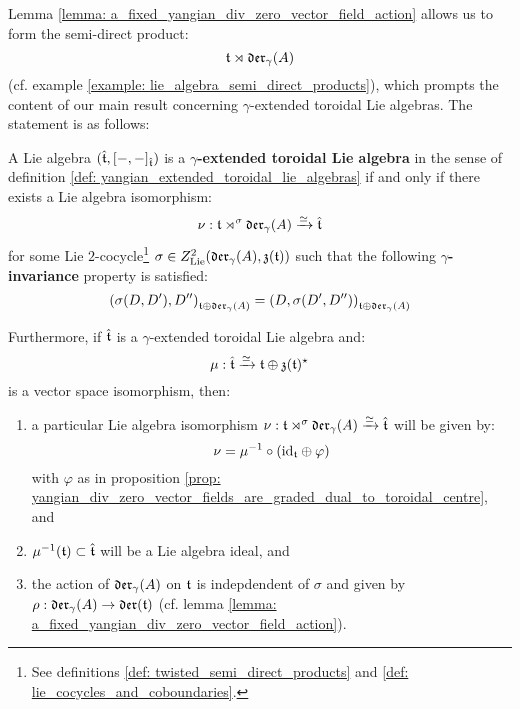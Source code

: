         Lemma \ref{lemma: a_fixed_yangian_div_zero_vector_field_action} allows us to form the semi-direct product:
            $$\mathfrak{t} \rtimes \mathfrak{der}_{\gamma}(A)$$
        (cf. example \ref{example: lie_algebra_semi_direct_products}), which prompts the content of our main result concerning $\gamma$-extended toroidal Lie algebras. The statement is as follows:
        \begin{theorem} \label{theorem: yangian_extended_toroidal_lie_algebras_main_theorem}
            A Lie algebra $(\hat{\mathfrak{t}}, [-, -]_{\hat{\mathfrak{t}}})$ is a \textbf{$\gamma$-extended toroidal Lie algebra} in the sense of definition \ref{def: yangian_extended_toroidal_lie_algebras} if and only if there exists a Lie algebra isomorphism:
                $$\nu: \mathfrak{t} \rtimes^{\sigma} \mathfrak{der}_{\gamma}(A) \xrightarrow[]{\simeq} \hat{\mathfrak{t}}$$
            for some Lie $2$-cocycle\footnote{See definitions \ref{def: twisted_semi_direct_products} and \ref{def: lie_cocycles_and_coboundaries}.} $\sigma \in Z^2_{\mathrm{Lie}}(\mathfrak{der}_{\gamma}(A), \mathfrak{z}(\mathfrak{t}))$ such that the following \textbf{$\gamma$-invariance} property is satisfied:
                $$\left( \sigma(D, D'), D'' \right)_{\mathfrak{t} \oplus \mathfrak{der}_{\gamma}(A)} = \left( D, \sigma(D', D'') \right)_{\mathfrak{t} \oplus \mathfrak{der}_{\gamma}(A)}$$
                
            Furthermore, if $\hat{\mathfrak{t}}$ is a $\gamma$-extended toroidal Lie algebra and:
                $$\mu: \hat{\mathfrak{t}} \xrightarrow[]{\simeq} \mathfrak{t} \oplus \mathfrak{z}(\mathfrak{t})^{\star}$$
            is a vector space isomorphism, then:
            \begin{enumerate}
                \item a particular Lie algebra isomorphism $\nu: \mathfrak{t} \rtimes^{\sigma} \mathfrak{der}_{\gamma}(A) \xrightarrow[]{\simeq} \hat{\mathfrak{t}}$ will be given by:
                    $$\nu = \mu^{-1} \circ (\mathrm{id}_{\mathfrak{t}} \oplus \varphi)$$
                with $\varphi$ as in proposition \ref{prop: yangian_div_zero_vector_fields_are_graded_dual_to_toroidal_centre}, and
                \item $\mu^{-1}(\mathfrak{t}) \subset \hat{\mathfrak{t}}$ will be a Lie algebra ideal, and
                \item the action of $\mathfrak{der}_{\gamma}(A)$ on $\mathfrak{t}$ is indepdendent of $\sigma$ and given by $\rho: \mathfrak{der}_{\gamma}(A) \to \mathfrak{der}(\mathfrak{t})$ (cf. lemma \ref{lemma: a_fixed_yangian_div_zero_vector_field_action}).
            \end{enumerate}
        \end{theorem}
